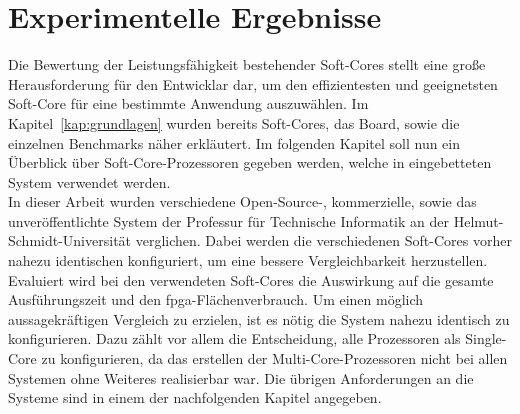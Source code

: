 %
%
%
%

\chapter{Experimentelle Ergebnisse}\label{kap:ergebnisse}
Die Bewertung der Leistungsfähigkeit bestehender Soft-Cores stellt eine große Herausforderung für den Entwicklar dar, um den effizientesten und geeignetsten Soft-Core
für eine bestimmte Anwendung auszuwählen. Im Kapitel~\ref{kap:grundlagen} wurden bereits Soft-Cores, das Board, sowie die einzelnen Benchmarks näher erkläutert. Im folgenden Kapitel
soll nun ein Überblick über Soft-Core-Prozessoren gegeben werden, welche in eingebetteten System verwendet werden. \\
In dieser Arbeit wurden verschiedene Open-Source-, kommerzielle, sowie das unveröffentlichte System der Professur für Technische Informatik an der Helmut-Schmidt-Universität verglichen.
Dabei werden die verschiedenen Soft-Cores vorher nahezu identischen konfiguriert, um eine bessere Vergleichbarkeit herzustellen. Evaluiert wird bei den verwendeten Soft-Cores
die Auswirkung auf die gesamte Ausführungszeit und den \ac{fpga}-Flächenverbrauch. Um einen möglich aussagekräftigen Vergleich zu erzielen, ist es nötig die System nahezu identisch zu
konfigurieren. Dazu zählt vor allem die Entscheidung, alle Prozessoren als Single-Core zu konfigurieren, da das erstellen der Multi-Core-Prozessoren nicht bei allen Systemen ohne Weiteres
realisierbar war. Die übrigen Anforderungen an die Systeme sind in einem der nachfolgenden Kapitel angegeben.\\


